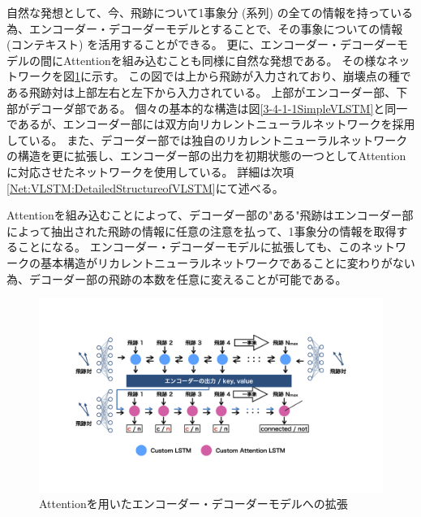 自然な発想として、今、飛跡について1事象分 (系列) の全ての情報を持っている為、エンコーダー・デコーダーモデルとすることで、その事象についての情報 (コンテキスト) を活用することができる。
更に、エンコーダー・デコーダーモデルの間にAttentionを組み込むことも同様に自然な発想である。
その様なネットワークを図\ref{3-4-1-2EncoderDecoderVLSTM}に示す。
この図では上から飛跡が入力されており、崩壊点の種である飛跡対は上部左右と左下から入力されている。
上部がエンコーダー部、下部がデコーダ部である。
個々の基本的な構造は図\ref{3-4-1-1SimpleVLSTM}と同一であるが、エンコーダー部には双方向リカレントニューラルネットワークを採用している。
また、デコーダー部では独自のリカレントニューラルネットワークの構造を更に拡張し、エンコーダー部の出力を初期状態の一つとしてAttentionに対応させたネットワークを使用している。
詳細は次項\ref{Net:VLSTM:DetailedStructureofVLSTM}にて述べる。

Attentionを組み込むことによって、デコーダー部の"ある"飛跡はエンコーダー部によって抽出された飛跡の情報に任意の注意を払って、1事象分の情報を取得することになる。
エンコーダー・デコーダーモデルに拡張しても、このネットワークの基本構造がリカレントニューラルネットワークであることに変わりがない為、デコーダー部の飛跡の本数を任意に変えることが可能である。

\begin{figure}[h]
 \centering
 \includegraphics[trim = 0 80 0 0, width=1.0\textwidth]{Figure/3Networks/3-4-1-2EncoderDecoderVLSTM.png}
 \caption{Attentionを用いたエンコーダー・デコーダーモデルへの拡張}
 \label{3-4-1-2EncoderDecoderVLSTM}
\end{figure}

